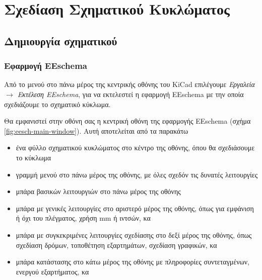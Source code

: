 \documentclass[a4paper]{article}
\begin{document}
\newpage
\section{Σχεδίαση Σχηματικού Κυκλώματος}

\subsection{Δημιουργία σχηματικού}

\subsubsection{\textenglish{Εφαρμογή EEschema} }
Από το μενού στο πάνω μέρος της κεντρικής οθόνης του \textenglish{KiCad} επιλέγουμε \textit{Εργαλεία $\rightarrow$ Εκτέλεση \textenglish{EEschema}}, για να εκτελεστεί η εφαρμογή \textenglish{EEschema} με την οποία σχεδιάζουμε το σχηματικό κύκλωμα. 

Θα εμφανιστεί στην οθόνη σας η κεντρική οθόνη της εφαρμογής \textenglish{EEschema} (σχήμα \ref{fig:eesch-main-window}). Αυτή αποτελείται από τα παρακάτω
\begin{itemize}
    \item ένα φύλλο σχηματικού κυκλώματος στο κέντρο της οθόνης, όπου θα σχεδιάσουμε το κύκλωμα
    \item γραμμή μενού στο πάνω μέρος της οθόνης, με όλες σχεδόν τις δυνατές λειτουργίες
    \item μπάρα βασικών λειτουργιών στο πάνω μέρος της οθόνης
    \item μπάρα με γενικές λειτουργίες στο αριστερό μέρος της οθόνης, όπως για εμφάνιση ή όχι του πλέγματος, χρήση mm ή ιντσών, κα
    \item μπάρα με συγκεκριμένες λειτουργίες σχεδίασης στο δεξί μέρος της οθόνης, όπως σχεδίαση δρόμων, τοποθέτηση εξαρτημάτων, σχεδίαση γραφικών, κα
    \item μπάρα κατάστασης στο κάτω μέρος της οθόνης με πληροφορίες συντεταγμένων, ενεργού εξαρτήματος, κα
\end{itemize}
\end{document}
